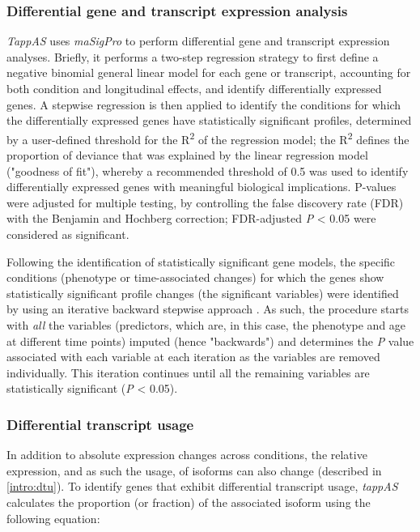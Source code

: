 \subsubsection{Differential gene and transcript expression analysis}
\label{diffrential_exp}
\textit{TappAS} uses \textit{maSigPro} to perform differential gene and transcript expression analyses\cite{Nueda2014}. Briefly, it performs a two-step regression strategy to first define a negative binomial general linear model\cite{Nueda2014} for each gene or transcript, accounting for both condition and longitudinal effects, and identify differentially expressed genes. A stepwise regression is then applied to identify the conditions for which the differentially expressed genes have statistically significant profiles, determined by a user-defined threshold for the R\textsuperscript{2} of the regression model; the R\textsuperscript{2} defines the proportion of deviance that was explained by the linear regression model ("goodness of fit"), whereby a recommended threshold of 0.5 was used to identify differentially expressed genes with meaningful biological implications\cite{Conesa2006}. P-values were adjusted for multiple testing, by controlling the false discovery rate (FDR) with the Benjamin and Hochberg correction; FDR-adjusted \textit{P} < 0.05 were considered as significant.

Following the identification of statistically significant gene models, the specific conditions (phenotype or time-associated changes) for which the genes show statistically significant profile changes (the significant variables) were identified by using an iterative backward stepwise approach \cite{Conesa2017}. As such, the procedure starts with \textit{all} the variables (predictors, which are, in this case, the phenotype and age at different time points) imputed (hence "backwards") and determines the \textit{P} value associated with each variable at each iteration as the variables are removed individually. This iteration continues until all the remaining variables are statistically significant (\textit{P} < 0.05). 

\subsubsection{Differential transcript usage}
\label{ch:diu_method}
In addition to absolute expression changes across conditions, the relative expression, and as such the usage, of isoforms can also change (described in \cref{intro:dtu}). To identify genes that exhibit differential transcript usage, \textit{tappAS} calculates the proportion (or fraction) of the associated isoform using the following equation:

